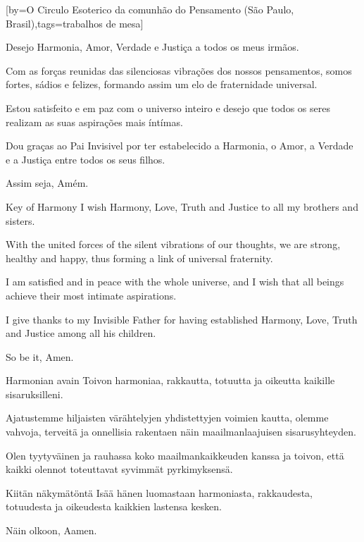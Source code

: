 \begin{songs}{}
      [by={O Circulo Esoterico da comunhão do Pensamento (São Paulo, Brasil)},tags={trabalhos de mesa}]
        \begin{passage}[PT]{}
          Desejo Harmonia, Amor, Verdade e Justiça a todos os
          meus irmãos.
          \par
          Com as forças reunidas das silenciosas vibrações
          dos nossos pensamentos, somos fortes, sádios e
          felizes, formando assim um elo de fraternidade
          universal.
          \par
          Estou satisfeito e em paz com o universo inteiro
          e desejo que todos os seres realizam as suas
          aspirações mais íntímas.
          \par
          Dou graças ao Pai Invisivel por ter estabelecido
          a Harmonia, o Amor, a Verdade e a Justiça entre
          todos os seus filhos.
          \par
          Assim seja, Amém.
        \end{passage}
        \hardbrk
        \begin{passage}[EN]{Key of Harmony}
          I wish Harmony, Love, Truth and Justice to all my
          brothers and sisters.
          \par
          With the united forces of the silent vibrations
          of our thoughts, we are strong, healthy and happy,
          thus forming a link of universal fraternity.
          \par
          I am satisfied and in peace with the whole
          universe, and I wish that all beings achieve their
          most intimate aspirations.
          \par
          I give thanks to my Invisible Father for having
          established Harmony, Love, Truth and Justice among
          all his children.
          \par
          So be it, Amen.
        \end{passage}
        \begin{passage}[FI]{Harmonian avain}
          Toivon harmoniaa, rakkautta, totuutta ja oikeutta kaikille sisaruksilleni.
          \par
          Ajatustemme hiljaisten värähtelyjen yhdistettyjen voimien kautta, olemme
          vahvoja, terveitä ja onnellisia rakentaen näin maailmanlaajuisen
          sisarusyhteyden.
          \par
          Olen tyytyväinen ja rauhassa koko maailmankaikkeuden kanssa ja toivon,
          että kaikki olennot toteuttavat syvimmät pyrkimyksensä.
          \par
          Kiitän näkymätöntä Isää hänen luomastaan harmoniasta, rakkaudesta,
          totuudesta ja oikeudesta kaikkien lastensa kesken.
          \par
          Näin olkoon, Aamen.
        \end{passage}
      \endsong
      

\end{songs}
